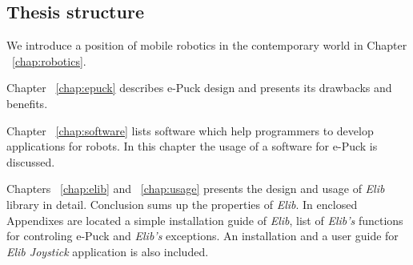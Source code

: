 	\subsection*{Thesis structure}
	We introduce a position of mobile robotics in the contemporary world in Chapter ~\ref{chap:robotics}.

	Chapter ~\ref{chap:epuck} describes e-Puck design and presents its drawbacks and benefits.

	Chapter ~\ref{chap:software} lists software which help programmers to develop applications for robots.
	In this chapter the usage of a software for e-Puck is discussed. 
	
	Chapters ~\ref{chap:elib} and ~\ref{chap:usage} presents the design and usage of {\it Elib} library in detail.
	Conclusion sums up the properties of {\it Elib}.
	In enclosed Appendixes are located a simple installation guide of {\it Elib}, list of {\it Elib's} functions 
	for controling e-Puck and {\it Elib's} exceptions. 
	An installation and a user guide for {\it Elib Joystick} application is also included. 


